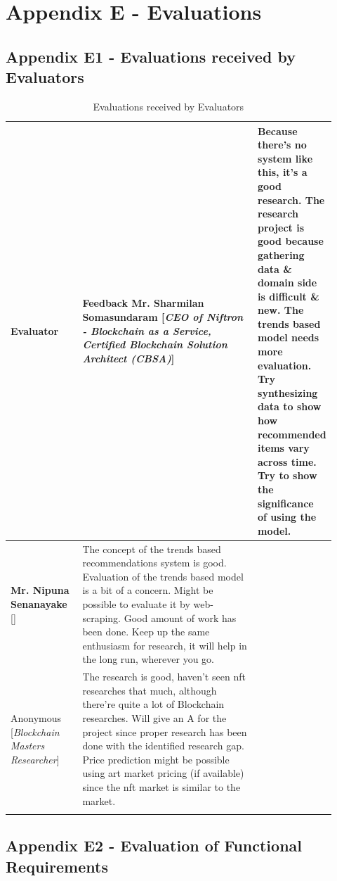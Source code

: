 \chapter{Appendix E - Evaluations}
\label{appendix:evaluation}

\section*{Appendix E1 - Evaluations received by Evaluators}


\vspace{-4mm}
\begin{longtable}{|p{0.23\linewidth}|p{0.69\linewidth}|}
\caption{Evaluations received by Evaluators}
\label{tab:evaluators-eval-feedback}
\\
\hline
\textbf{Evaluator} & \textbf{Feedback} \endfirsthead
\hline
\textbf{Mr. Sharmilan Somasundaram}
[\textit{CEO of Niftron - Blockchain as a Service, Certified Blockchain Solution Architect (CBSA)}]
&  Because there's no system like this, it's a good research. The research project is good because gathering data \& domain side is difficult \& new.
The trends based model needs more evaluation. Try synthesizing data to show how recommended items vary across time. Try to show the significance of using the model.
\\
\hline
\textbf{Mr. Nipuna Senanayake} [\textit{}] & The concept of the trends based recommendations system is good. Evaluation of the trends based model is a bit of a concern. Might be possible to evaluate it by web-scraping.
Good amount of work has been done. Keep up the same enthusiasm for research, it will help in the long run, wherever you go.
 \\
\hline
Anonymous [\textit{Blockchain Masters Researcher}] & The research is good, haven't seen \gls{nft} researches that much, although there're quite a lot of Blockchain researches. Will give an A for the project since proper research has been done with the identified research gap.
Price prediction might be possible using art market pricing (if available) since the \gls{nft} market is similar to the market.
\\
\hline
 & \\
\hline
\end{longtable}

\section*{Appendix E2 - Evaluation of Functional Requirements}

